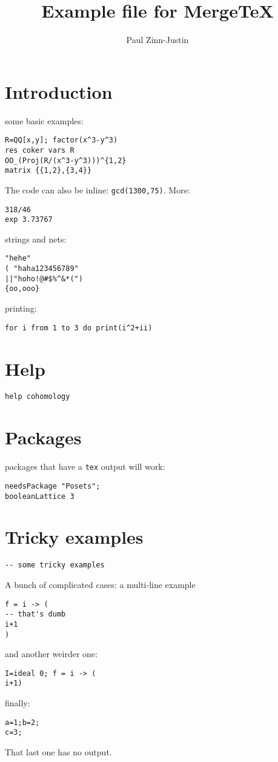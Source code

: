 \documentclass[12pt,a4paper]{amsart}
\title{Example file for MergeTeX}
\author{Paul Zinn-Justin}
\begin{document}
\maketitle

\section{Introduction}
some basic examples:
\begin{lstlisting}[language=Macaulay2]
R=QQ[x,y]; factor(x^3-y^3)
res coker vars R
OO_(Proj(R/(x^3-y^3)))^{1,2}
matrix {{1,2},{3,4}}
\end{lstlisting}

The code can also be inline: \lstinline[language=Macaulay2]!gcd(1300,75)!.
More:
\begin{lstlisting}[language=Macaulay2]
318/46
exp 3.73767
\end{lstlisting}
strings and nets:
\begin{lstlisting}[language=Macaulay2]
"hehe"
( "haha123456789"
||"hoho!@#$%^&*(")
{oo,ooo}
\end{lstlisting}
printing:
\begin{lstlisting}[language=Macaulay2]
for i from 1 to 3 do print(i^2+ii)
\end{lstlisting}

\section{Help}
\begin{lstlisting}[language=Macaulay2]
help cohomology
\end{lstlisting}

\section{Packages}
packages that have a {\tt tex} output will work:
\begin{lstlisting}[language=Macaulay2]
needsPackage "Posets";
booleanLattice 3
\end{lstlisting}

\section{Tricky examples}
\begin{lstlisting}[language=Macaulay2]
-- some tricky examples
\end{lstlisting}
A bunch of complicated cases: a multi-line example
\begin{lstlisting}[language=Macaulay2]
f = i -> (
-- that's dumb
i+1
)
\end{lstlisting}
and another weirder one:
\begin{lstlisting}[language=Macaulay2]
I=ideal 0; f = i -> (
i+1)
\end{lstlisting}
finally:
\begin{lstlisting}[language=Macaulay2]
a=1;b=2;
c=3;
\end{lstlisting}
That last one has no output.
\end{document}
